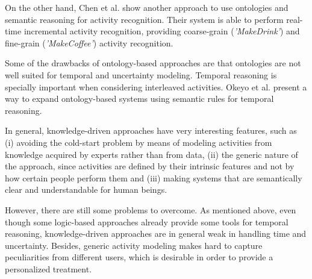 On the other hand, Chen et al. \cite{Chen2012a} show another approach to use ontologies and semantic reasoning for activity recognition. Their system is able to perform real-time incremental activity recognition, providing coarse-grain (\textit{'MakeDrink'}) and fine-grain (\textit{'MakeCoffee'}) activity recognition. 

Some of the drawbacks of ontology-based approaches are that ontologies are not well suited for temporal and uncertainty modeling. Temporal reasoning is specially important when considering interleaved activities. Okeyo et al. \cite{Okeyo2012} present a way to expand ontology-based systems using semantic rules for temporal reasoning.

In general, knowledge-driven approaches have very interesting features, such as (i) avoiding the cold-start problem by means of modeling activities from knowledge acquired by experts rather than from data, (ii) the generic nature of the approach, since activities are defined by their intrinsic features and not by how certain people perform them and (iii) making systems that are semantically clear and understandable for human beings.

However, there are still some problems to overcome. As mentioned above, even though some logic-based approaches already provide some tools for temporal reasoning, knowledge-driven approaches are in general weak in handling time and uncertainty. Besides, generic activity modeling makes hard to capture peculiarities from different users, which is desirable in order to provide a personalized treatment. 